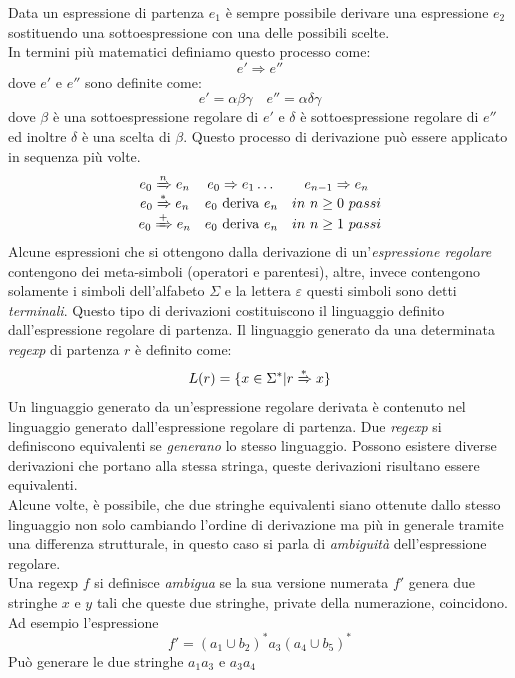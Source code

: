 Data un espressione di partenza $ e_1 $ è sempre possibile derivare una espressione $ e_2 $ sostituendo una sottoespressione con una delle possibili scelte.\\
In termini più matematici definiamo questo processo come:
$$e'\Rightarrow e''$$
dove $ e' $ e $ e'' $ sono definite come:
$$e' = \alpha\beta\gamma \quad e'' = \alpha\delta\gamma$$
dove $ \beta $ è una sottoespressione regolare di $ e' $ e $ \delta $ è sottoespressione regolare di $ e'' $ ed inoltre $ \delta $ è una scelta di $ \beta $. Questo processo di derivazione può essere applicato in sequenza più volte.
$$
\begin{array}{ccc}
e_0\xRightarrow{n} e_n &e_0\Rightarrow e_1\dots&e_{n-1}\Rightarrow e_n\\
e_0 \xRightarrow{\ast} e_n & e_0 \text{ deriva } e_n & in \ n\geq 0 \ passi\\
e_0 \xRightarrow{+} e_n & e_0 \text{ deriva } e_n & in \ n\geq 1 \ passi
\end{array}$$
Alcune espressioni che si ottengono dalla derivazione di un'\emph{espressione regolare} contengono dei meta-simboli (operatori e parentesi), altre, invece contengono solamente i simboli dell'alfabeto $ \Sigma $ e la lettera $ \varepsilon $ questi simboli sono detti \emph{terminali}.
Questo tipo di derivazioni costituiscono il linguaggio definito dall'espressione regolare di partenza. Il linguaggio generato da una determinata \emph{regexp} di partenza $ r $ è definito come:
$$L(r) = \{x \in \Sigma^\ast | r \xRightarrow{\ast} x \}$$
Un linguaggio generato da un'espressione regolare derivata è contenuto nel linguaggio generato dall'espressione regolare di partenza. Due \emph{regexp} si definiscono equivalenti se \emph{generano} lo stesso linguaggio. Possono esistere diverse derivazioni che portano alla stessa stringa, queste derivazioni risultano essere equivalenti.\\
Alcune volte, è possibile, che due stringhe equivalenti siano ottenute dallo stesso linguaggio non solo cambiando l'ordine di derivazione ma più in generale tramite una differenza strutturale, in questo caso si parla di \emph{ambiguità} dell'espressione regolare.\\
Una regexp $ f $ si definisce \emph{ambigua} se la sua versione numerata $ f' $ genera due stringhe $ x $ e $ y $ tali che queste due stringhe, private della numerazione, coincidono. Ad esempio l'espressione 
$$f'= (a_1\cup b_2)^\ast a_3 (a_4 \cup b_5)^\ast$$
Può generare le due stringhe $a_1a_3$ e $a_3a_4$
